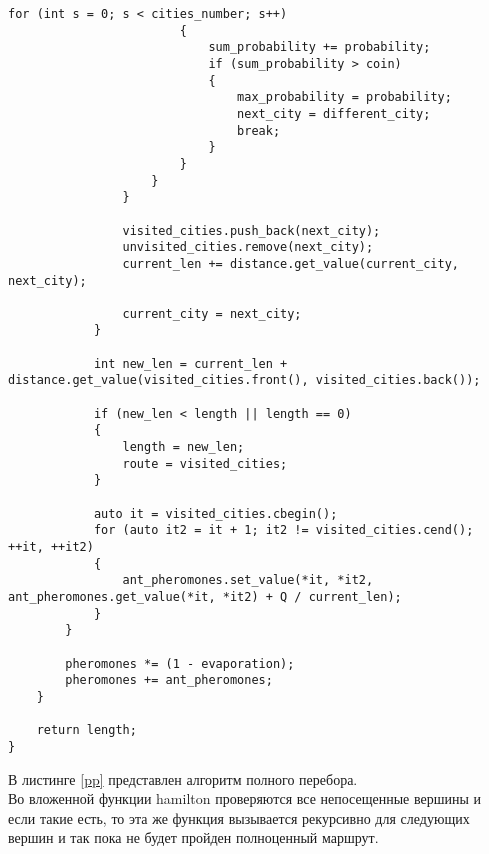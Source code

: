 \documentclass[a4paper, 14pt]{article}
\begin{document}
\begin{lstlisting}[label=aco,caption=Муравьиный алгоритм]
                        for (int s = 0; s < cities_number; s++)
                        {
                            sum_probability += probability;
                            if (sum_probability > coin)
                            {
                                max_probability = probability;
                                next_city = different_city;
                                break;
                            }
                        }
                    }
                }
                
                visited_cities.push_back(next_city);
                unvisited_cities.remove(next_city);
                current_len += distance.get_value(current_city, next_city);
                
                current_city = next_city;
            }

            int new_len = current_len + distance.get_value(visited_cities.front(), visited_cities.back());
 
            if (new_len < length || length == 0)
            {
                length = new_len;
                route = visited_cities;
            }

            auto it = visited_cities.cbegin();
            for (auto it2 = it + 1; it2 != visited_cities.cend(); ++it, ++it2)
            {
                ant_pheromones.set_value(*it, *it2, ant_pheromones.get_value(*it, *it2) + Q / current_len);
            }
        }

        pheromones *= (1 - evaporation);
        pheromones += ant_pheromones;
    }
    
    return length;
}

\end{lstlisting}

	В листинге \ref{pp} представлен алгоритм полного перебора.\\
	
Во вложенной функции hamilton проверяются все непосещенные вершины и если такие есть, то эта же функция вызывается рекурсивно для следующих вершин и так пока не будет пройден полноценный маршрут.
\end{document}
